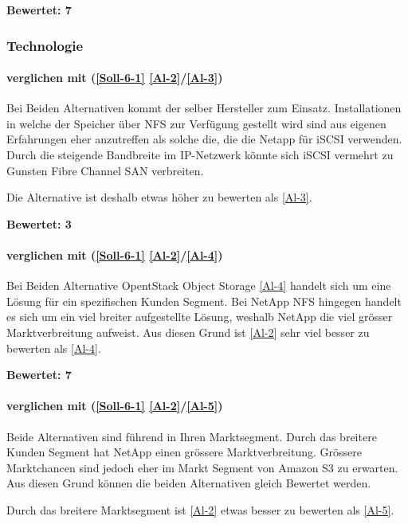 \textbf{Bewertet: 7}

\subsubsection{Technologie}

\paragraph*{  verglichen mit  (\ref{Soll-6-1} \ref{Al-2}/\ref{Al-3})}
Bei Beiden Alternativen kommt der selber Hersteller zum Einsatz. Installationen in welche der Speicher über NFS zur Verfügung gestellt wird sind aus eigenen Erfahrungen eher anzutreffen als solche die, die die Netapp für iSCSI verwenden. Durch die steigende Bandbreite im IP-Netzwerk könnte sich iSCSI vermehrt zu Gunsten Fibre Channel SAN verbreiten.

Die Alternative   ist deshalb etwas höher zu bewerten als  \ref{Al-3}.

\textbf{Bewertet: 3}

\paragraph*{  verglichen mit  (\ref{Soll-6-1} \ref{Al-2}/\ref{Al-4})}
Bei Beiden Alternative OpentStack Object Storage \ref{Al-4} handelt sich um eine Lösung für ein spezifischen Kunden Segment. Bei NetApp NFS hingegen handelt es sich um ein viel breiter aufgestellte Lösung, weshalb NetApp die viel grösser Marktverbreitung aufweist. Aus diesen Grund ist  \ref{Al-2} sehr viel besser zu bewerten als  \ref{Al-4}.

\textbf{Bewertet: 7}

\paragraph*{  verglichen mit  (\ref{Soll-6-1} \ref{Al-2}/\ref{Al-5})}
Beide Alternativen sind führend in Ihren Marktsegment. Durch das breitere Kunden Segment hat NetApp einen grössere Marktverbreitung. Grössere Marktchancen sind jedoch eher im Markt Segment von Amazon S3 zu erwarten. Aus diesen Grund können die beiden Alternativen gleich Bewertet werden.

Durch das breitere Marktsegment ist  \ref{Al-2} etwas besser zu bewerten als  \ref{Al-5}.

